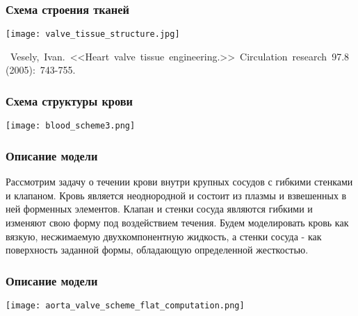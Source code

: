 \documentclass[14pt]{beamer}
\begin{document}
\begin{frame}
\frametitle{Схема строения тканей}
    \begin{center}
        \texttt{[image: valve\_tissue\_structure.jpg]}
    \end{center}

    \begin{spacing}{0.5}
        \mbox{\scriptsize
            Vesely, Ivan. <<Heart valve tissue engineering.>> Circulation research 97.8 (2005): 743-755.
        }
    \end{spacing}

\end{frame}

\begin{frame}
\frametitle{Схема структуры крови}
    \begin{center}
        \texttt{[image: blood\_scheme3.png]}
    \end{center}
\end{frame}

\begin{frame}
\frametitle{Описание модели}
Рассмотрим задачу о течении крови внутри крупных сосудов с гибкими стенками и клапаном. Кровь является неоднородной и состоит из плазмы и взвешенных в ней форменных элементов. Клапан и стенки сосуда являются гибкими и изменяют свою форму под воздействием течения. Будем моделировать кровь как вязкую, несжимаемую двухкомпонентную жидкость, а стенки сосуда - как поверхность заданной формы, обладающую определенной жесткостью.
\end{frame}

\begin{frame}
\frametitle{Описание модели}
    \begin{center}
        \texttt{[image: aorta\_valve\_scheme\_flat\_computation.png]}
    \end{center}
\end{frame}
\end{document}
